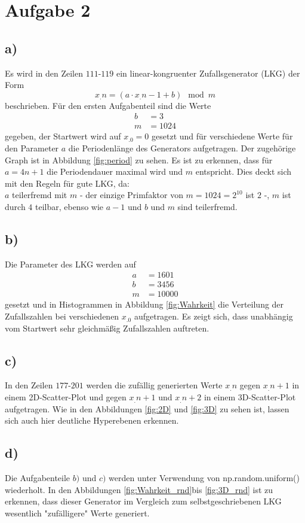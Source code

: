 \section{Aufgabe 2}
\label{sec:Aufgabe2}
\subsection*{a)}
Es wird in den Zeilen $111$-$119$ ein linear-kongruenter Zufallsgenerator (LKG) der Form
\begin{equation}
x_.n=(a\cdot x_.{n-1}+b)\mod m \label{eq:LKG}
\end{equation}
beschrieben. Für den ersten Aufgabenteil sind die Werte
\begin{align*}
b&=3\\
m&=1024
\end{align*}
gegeben, der Startwert wird auf $x_.0=0$ gesetzt und für verschiedene Werte für den Parameter $a$ die Periodenlänge des Generators aufgetragen.
Der zugehörige Graph ist in Abbildung \ref{fig:period} zu sehen.
Es ist zu erkennen, dass für $a = 4n +1$ die Periodendauer maximal wird und $m$ entspricht. Dies deckt sich mit den Regeln für gute LKG, da:\\
$a$ teilerfremd mit $m$ - der einzige Primfaktor von $m=1024=2^{10}$ ist $2$ -, $m$ ist durch $4$ teilbar, ebenso wie $a-1$ und $b$ und $m$ sind teilerfremd.
\subsection*{b)}
Die Parameter des LKG werden auf
\begin{align*}
a&=1601\\
b&=3456\\
m&=10000
\end{align*}
gesetzt und in Histogrammen in Abbildung \ref{fig:Wahrkeit} die Verteilung der Zufallszahlen bei verschiedenen $x_.0$ aufgetragen.
Es zeigt sich, dass unabhängig vom Startwert sehr gleichmäßig Zufallszahlen auftreten.
\subsection*{c)}
In den Zeilen $177$-$201$ werden die zufällig generierten Werte $x_.n$ gegen $x_.{n+1}$ in einem 2D-Scatter-Plot und gegen $x_.{n+1}$ und $x_.{n+2}$ in einem 3D-Scatter-Plot aufgetragen. Wie in den Abbildungen \ref{fig:2D} und \ref{fig:3D} zu sehen ist, lassen sich auch hier deutliche Hyperebenen erkennen.
\subsection*{d)}
Die Aufgabenteile $b)$ und $c)$ werden unter Verwendung von np.random.uniform() wiederholt. In den Abbildungen \ref{fig:Wahrkeit_rnd}bis \ref{fig:3D_rnd} ist zu erkennen, dass dieser Generator im Vergleich zum selbstgeschriebenen LKG wesentlich "zufälligere" Werte generiert.
